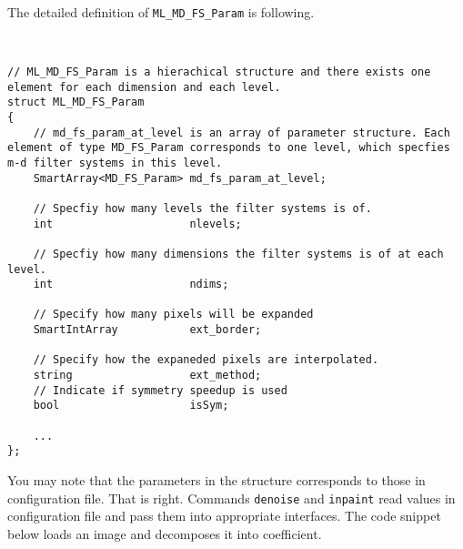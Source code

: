 \documentclass[a4paper,5pt]{article}
\begin{document}
  
  The detailed definition of \lstinline{ML_MD_FS_Param} is following.
\begin{lstlisting}


// ML_MD_FS_Param is a hierachical structure and there exists one element for each dimension and each level.
struct ML_MD_FS_Param
{
	// md_fs_param_at_level is an array of parameter structure. Each element of type MD_FS_Param corresponds to one level, which specfies m-d filter systems in this level.
	SmartArray<MD_FS_Param> md_fs_param_at_level;
	
	// Specfiy how many levels the filter systems is of.
	int 					nlevels;
	
	// Specfiy how many dimensions the filter systems is of at each level.
	int 					ndims;
	
	// Specify how many pixels will be expanded
	SmartIntArray			ext_border;
	
	// Specify how the expaneded pixels are interpolated.
	string					ext_method;
	// Indicate if symmetry speedup is used
	bool 					isSym;
	
	...
};
\end{lstlisting}

You may note that the parameters in the structure corresponds to those in configuration file. That is right. Commands \lstinline{denoise} and \lstinline{inpaint} read values in configuration file and pass them into appropriate interfaces. The code snippet below loads an image and decomposes it into coefficient.
\end{document}
